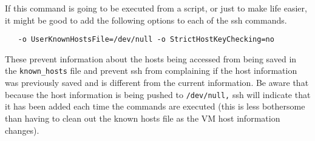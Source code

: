 If this command is going to be executed from a script, or just to make life easier, it  might be good to add the following options
to each of the ssh commands.

\small\begin{verbatim}
   -o UserKnownHostsFile=/dev/null -o StrictHostKeyChecking=no 
\end{verbatim}\normalsize

These prevent information about the hosts being accessed  from being saved in the \verb!known_hosts! file and prevent ssh from 
complaining if the host information was previously saved and is different from the current information. 
Be aware that because the host information is being pushed to \verb!/dev/null,! ssh will indicate that it has been added 
each time the commands are executed (this is less bothersome than having to clean out the known hosts file as the 
VM host information changes).
